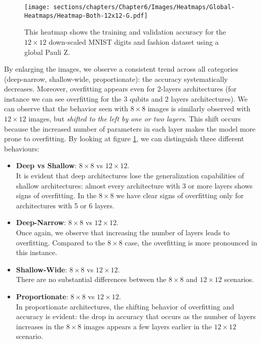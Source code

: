 \begin{figure}[h]
    \centering
    \texttt{[image: sections/chapters/Chapter6/Images/Heatmaps/Global-Heatmaps/Heatmap-Both-12x12-G.pdf]}
    \caption{This heatmap shows the training and validation accuracy for the $12\times12$ 
    down-scaled MNIST digits and fashion dataset using a global Pauli Z.}
    \label{fig:heatmap-12x12-G}
\end{figure}

By enlarging the images, we observe a consistent trend across all categories 
(deep-narrow, shallow-wide, proportionate): the accuracy systematically decreases.
Moreover, overfitting appears even for 2-layers architectures (for instance we can see overfitting for the 
3 qubits and 2 layers architectures).
We can observe that the behavior seen with $8 \times 8$ images is similarly observed with 
$12 \times 12$ images, but \textit{shifted to the left by one or two layers}. This shift 
occurs because the increased number of parameters in each layer makes the model more prone to overfitting.
By looking at figure \ref{fig:heatmap-12x12-G}, we can distinguish 
three different behaviours:

\begin{itemize}
    \item \textbf{Deep vs Shallow}: $8\times8$ vs $12\times12$.\\
    It is evident that deep architectures lose the generalization capabilities of shallow architectures:
    almost every architecture with 3 or more layers shows signs of overfitting.
    In the $8\times8$ we have clear signs of overfitting only for architectures with 5 or 6 layers.
    \item \textbf{Deep-Narrow}: $8\times8$ vs $12\times12$.\\
    Once again, we observe that increasing the number of layers leads to overfitting. 
    Compared to the $8 \times 8$ case, the overfitting is more pronounced in this instance.
    \item \textbf{Shallow-Wide}: $8\times8$ vs $12\times12$.\\
    There are no substantial differences between the $8\times8$ and $12\times12$ scenarios.
    \item \textbf{Proportionate}: $8\times8$ vs $12\times12$.\\
    In proportionate architectures, the shifting behavior of overfitting and accuracy 
    is evident: the drop in accuracy that occurs as the number of layers increases in the $8 \times 8$ 
    images appears a few layers earlier in the $12 \times 12$ scenario.
 \end{itemize}